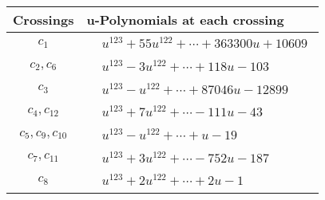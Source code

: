 \documentclass[1p]{elsarticle_modified}
\theoremstyle{definition}
\begin{document}
\begin{tabular}{m{50pt}|m{274pt}}
Crossings & \hspace{64pt}u-Polynomials at each crossing \\
\hline $$\begin{aligned}c_{1}\end{aligned}$$&$\begin{aligned}
&u^{123}+55 u^{122}+\cdots+363300 u+10609
\end{aligned}$\\
\hline $$\begin{aligned}c_{2},c_{6}\end{aligned}$$&$\begin{aligned}
&u^{123}-3 u^{122}+\cdots+118 u-103
\end{aligned}$\\
\hline $$\begin{aligned}c_{3}\end{aligned}$$&$\begin{aligned}
&u^{123}- u^{122}+\cdots+87046 u-12899
\end{aligned}$\\
\hline $$\begin{aligned}c_{4},c_{12}\end{aligned}$$&$\begin{aligned}
&u^{123}+7 u^{122}+\cdots-111 u-43
\end{aligned}$\\
\hline $$\begin{aligned}c_{5},c_{9},c_{10}\end{aligned}$$&$\begin{aligned}
&u^{123}- u^{122}+\cdots+u-19
\end{aligned}$\\
\hline $$\begin{aligned}c_{7},c_{11}\end{aligned}$$&$\begin{aligned}
&u^{123}+3 u^{122}+\cdots-752 u-187
\end{aligned}$\\
\hline $$\begin{aligned}c_{8}\end{aligned}$$&$\begin{aligned}
&u^{123}+2 u^{122}+\cdots+2 u-1
\end{aligned}$\\
\hline
\end{tabular}\\~\\
\newpage\renewcommand{\arraystretch}{1}
\end{document}

